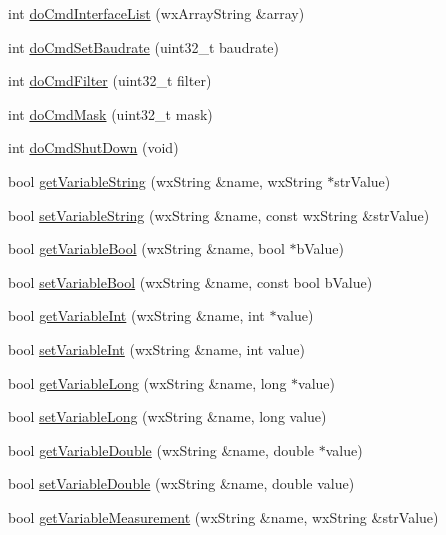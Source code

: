 \begin{DoxyCompactItemize}
\item 
int \hyperlink{class_vscp_tcp_if_ae3d57350ba2f6a2b6d7e8f95fa396eb9}{doCmdInterfaceList} (wxArrayString \&array)
\item 
int \hyperlink{class_vscp_tcp_if_a8af3b71315d11e39ce815f769d6d0c0b}{doCmdSetBaudrate} (uint32\_\-t baudrate)
\item 
int \hyperlink{class_vscp_tcp_if_a99d0afbd3e67580f522ad82c12ba8f73}{doCmdFilter} (uint32\_\-t filter)
\item 
int \hyperlink{class_vscp_tcp_if_a46a1e6c90682fc186fac38feea6ddc0a}{doCmdMask} (uint32\_\-t mask)
\item 
int \hyperlink{class_vscp_tcp_if_af26c3cf24df471a80bdb79cac8ca0a11}{doCmdShutDown} (void)
\item 
bool \hyperlink{class_vscp_tcp_if_ae224ef66329d897aba5b721e8433ea55}{getVariableString} (wxString \&name, wxString $\ast$strValue)
\item 
bool \hyperlink{class_vscp_tcp_if_a416f6467810f959bf9343902b31ca6fd}{setVariableString} (wxString \&name, const wxString \&strValue)
\item 
bool \hyperlink{class_vscp_tcp_if_a3bbd36dff45b9a2443e344a4419e1dd4}{getVariableBool} (wxString \&name, bool $\ast$bValue)
\item 
bool \hyperlink{class_vscp_tcp_if_a197604e909b52bb2c4e7198b2173c4c1}{setVariableBool} (wxString \&name, const bool bValue)
\item 
bool \hyperlink{class_vscp_tcp_if_a0276413297a2fcf5615a7bf83da28a51}{getVariableInt} (wxString \&name, int $\ast$value)
\item 
bool \hyperlink{class_vscp_tcp_if_a58d037aed6012c23e1aa2c69b359b268}{setVariableInt} (wxString \&name, int value)
\item 
bool \hyperlink{class_vscp_tcp_if_ab1c15254e579066ca4f5004597a097fc}{getVariableLong} (wxString \&name, long $\ast$value)
\item 
bool \hyperlink{class_vscp_tcp_if_a0940b618effec6c702d7218360f13837}{setVariableLong} (wxString \&name, long value)
\item 
bool \hyperlink{class_vscp_tcp_if_a0fa37c7b941ecaad227177841a24300e}{getVariableDouble} (wxString \&name, double $\ast$value)
\item 
bool \hyperlink{class_vscp_tcp_if_a288de864c2ac98c811cf0a212b151c85}{setVariableDouble} (wxString \&name, double value)
\item 
bool \hyperlink{class_vscp_tcp_if_ad0c4803857de3a2d259a96ebe6317192}{getVariableMeasurement} (wxString \&name, wxString \&strValue)

\end{DoxyCompactItemize}
